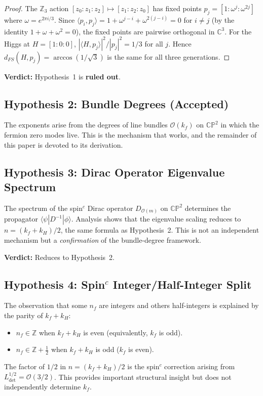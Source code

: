 \documentclass[11pt,a4paper]{article}
\newcommand{\CP}{\mathbb{CP}}
\newcommand{\Z}{\mathbb{Z}}
\newcommand{\C}{\mathbb{C}}
\theoremstyle{definition}
\theoremstyle{remark}
\begin{document}
\begin{proof}
The $\Z_3$ action $[z_0:z_1:z_2] \mapsto [z_1:z_2:z_0]$ has
fixed points $p_j = [1:\omega^j:\omega^{2j}]$ where $\omega = e^{2\pi i/3}$.
Since $\langle p_i, p_j \rangle = 1 + \omega^{j-i} + \omega^{2(j-i)} = 0$
for $i \neq j$ (by the identity $1 + \omega + \omega^2 = 0$), the fixed
points are pairwise orthogonal in $\C^3$.  For the Higgs at $H = [1:0:0]$,
$|\langle H, p_j \rangle|^2 / |p_j|^2 = 1/3$ for all $j$.  Hence
$d_{FS}(H, p_j) = \arccos(1/\sqrt{3})$ is the same for all three generations.
\end{proof}

\textbf{Verdict:} Hypothesis~1 is \textbf{ruled out}.

\subsection{Hypothesis 2: Bundle Degrees (Accepted)}

The exponents arise from the degrees of line bundles $\mathcal{O}(k_f)$
on $\CP^2$ in which the fermion zero modes live.  This is the mechanism
that works, and the remainder of this paper is devoted to its derivation.

\subsection{Hypothesis 3: Dirac Operator Eigenvalue Spectrum}

The spectrum of the spin$^c$ Dirac operator $D_{\mathcal{O}(m)}$ on $\CP^2$
determines the propagator $\langle \psi | D^{-1} | \phi \rangle$.  Analysis
shows that the eigenvalue scaling reduces to $n = (k_f + k_H)/2$, the same
formula as Hypothesis~2.  This is not an independent mechanism but a
\emph{confirmation} of the bundle-degree framework.

\textbf{Verdict:} Reduces to Hypothesis~2.

\subsection{Hypothesis 4: Spin$^c$ Integer/Half-Integer Split}

The observation that some $n_f$ are integers and others half-integers
is explained by the parity of $k_f + k_H$:
\begin{itemize}
\item $n_f \in \Z$ when $k_f + k_H$ is even (equivalently, $k_f$ is odd).
\item $n_f \in \Z + \frac{1}{2}$ when $k_f + k_H$ is odd ($k_f$ is even).
\end{itemize}
The factor of $1/2$ in $n = (k_f + k_H)/2$ is the spin$^c$ correction
arising from $L_{\det}^{1/2} = \mathcal{O}(3/2)$.  This provides important
structural insight but does not independently determine $k_f$.
\end{document}
